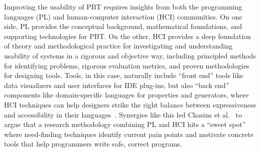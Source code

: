 
Improving the usability of PBT
requires insights from both the
programming languages (PL) and human-computer interaction (HCI)
communities.  On one side, PL provides the conceptual background,
mathematical foundations, and supporting technologies for PBT.  On the
other, HCI provides a deep foundation of theory and methodological
practice for investigating and understanding usability of systems in a
rigorous and objective way, including principled methods for
identifying problems, rigorous evaluation metrics, and proven
methodologies for designing tools. Tools, in this case, naturally include
``front end'' tools like
data visualizers and user interfaces for IDE plug-ins, but
also ``back end'' components like domain-specific languages for
properties and generators, where HCI techniques
can help designers
strike the right balance between expressiveness and
accessibility in their languages~\cite{coblenz_pliers_2021,greenman_little_2022}.
Synergies like this led
Chasins et al.~\cite{chasins_pl_2021} to argue that a research
methodology combining PL and HCI hits a ``sweet spot'' where
need-finding techniques identify current
pain points and motivate concrete tools that help programmers write
safe, correct programs.



